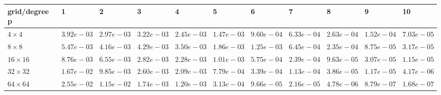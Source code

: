 \begin{tabular}{lllllllllll}
\hline
 grid/degree p   & 1          & 2          & 3          & 4          & 5          & 6          & 7          & 8          & 9          & 10         \\
\hline
 $4 \times 4$    & $3.92e-03$ & $2.97e-03$ & $3.22e-03$ & $2.45e-03$ & $1.47e-03$ & $9.60e-04$ & $6.33e-04$ & $2.63e-04$ & $1.52e-04$ & $7.03e-05$ \\
 $8 \times 8$    & $5.47e-03$ & $4.16e-03$ & $4.29e-03$ & $3.50e-03$ & $1.86e-03$ & $1.25e-03$ & $6.45e-04$ & $2.35e-04$ & $8.75e-05$ & $3.17e-05$ \\
 $16 \times 16$  & $8.76e-03$ & $6.55e-03$ & $2.82e-03$ & $2.28e-03$ & $1.01e-03$ & $5.75e-04$ & $2.39e-04$ & $9.63e-05$ & $3.07e-05$ & $1.15e-05$ \\
 $32 \times 32$  & $1.67e-02$ & $9.85e-03$ & $2.60e-03$ & $2.09e-03$ & $7.79e-04$ & $3.39e-04$ & $1.13e-04$ & $3.86e-05$ & $1.17e-05$ & $4.17e-06$ \\
 $64 \times 64$  & $2.55e-02$ & $1.15e-02$ & $1.74e-03$ & $1.20e-03$ & $3.13e-04$ & $9.66e-05$ & $2.16e-05$ & $4.78e-06$ & $8.79e-07$ & $1.68e-07$ \\
\hline
\end{tabular}